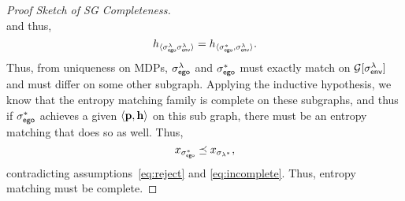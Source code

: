 \begin{proof}[Proof Sketch of SG Completeness]
\begin{equation}
  \end{equation}
  and thus,
  \begin{equation}
    h_{\langle \sigma_{\mathsf{ego}}^\lambda \sigma_{\mathsf{env}}^\lambda \rangle} =  h_{\langle \sigma_{\mathsf{ego}}^*, \sigma_{\mathsf{env}}^\lambda \rangle}.
  \end{equation}
  Thus, from uniqueness on MDPs, $\sigma_{\mathsf{ego}}^\lambda$ and
  $\sigma_{\mathsf{ego}}^*$ must exactly match on $\mathcal{G}[\sigma_{\mathsf{env}}^\lambda]$ and
  must differ on some other subgraph.  Applying the inductive
  hypothesis, we know that the entropy matching family is complete on
  these subgraphs, and thus if $\sigma_{\mathsf{ego}}^*$ achieves a given
  $\langle\mathbf{p}, \mathbf{h}\rangle$ on this sub graph, there
  must be an entropy matching that does so as well. Thus,
  \begin{equation}
    x_{\sigma_{\mathsf{ego}}^*} \preceq x_{\sigma_{\lambda^*}},
  \end{equation}
  contradicting
  assumptions~\eqref{eq:reject} and \eqref{eq:incomplete}.  Thus,
  entropy matching must be complete.
\end{proof}

